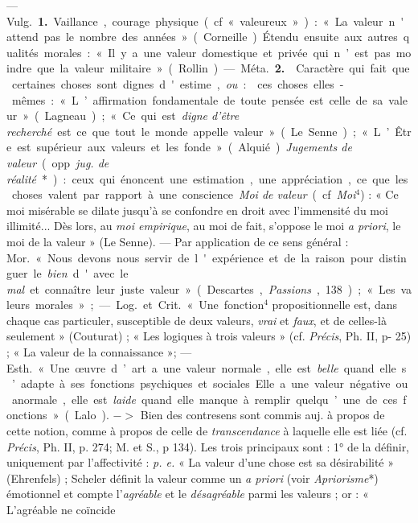 
	\begin{itemize}[leftmargin=1cm, label=, itemsep=1pt]

 — \si{Vulg.} {\bf 1.} Vaillance, courage physique (cf. «
valeureux ») : « La valeur n'attend pas le nombre des années » (Corneille).
Étendu ensuite aux autres qualités morales : « Il y a une valeur domestique et
privée qui n’est pas moindre que la valeur militaire » (Rollin).

— \si{Méta.}  {\bf 2.}  Caractère qui fait que certaines
choses sont dignes d'estime, {\it ou} :  ces choses
elles-mêmes : « L’affirmation fondamentale de toute pensée est celle de sa
valeur » (Lagneau) ; « Ce qui est {\it digne d’être recherché} est ce que
tout le monde appelle valeur » (Le Senne) ; « L’Être est supérieur aux
valeurs et les fonde » (Alquié). {\it Jugements de valeur} (opp. {\it jug. de
réalité}*) : ceux qui énoncent une estimation, une appréciation, ce que les
choses valent par rapport à une conscience. {\it Moi de valeur} (cf.
{\it Moi}$^4$) : « Ce moi misérable se dilate jusqu’à se confondre en droit
avec l’immensité du moi illimité... Dès lors, au {\it moi empirique}, au moi
de fait, s’oppose le moi {\it a priori}, le moi de la valeur » (Le Senne). —
Par application de ce sens général : \si{Mor.} « Nous devons nous servir de
l'expérience et de la raison pour distinguer le {\it bien} d'avec le {\it
mal} et connaître leur juste valeur » (Descartes, {\it Passions}, 138) ; «
Les valeurs morales » ; — \si{Log.} et \si{Crit.} « Une fonction$^4$
propositionnelle est, dans chaque cas particuler, susceptible de deux
valeurs, {\it vrai} et {\it faux}, et de celles-là seulement » (Couturat) ; «
Les logiques à trois valeurs » (cf. {\it Précis}, Ph. II, p- 25) ; « La
valeur de la connaissance »; — \si{Esth.} « Une œuvre d’art a une valeur
normale, elle est {\it belle} quand elle s’adapte à ses fonctions
psychiques et sociales... Elle a une valeur négative ou anormale, elle est
{\it laide} quand elle manque à remplir quelqu’une de ces fonctions » (Lalo).
$->$ Bien des contresens sont commis auj. à propos de cette notion, comme à
propos de celle de {\it transcendance} à laquelle elle est liée (cf.
{\it Précis}, Ph. II, p. 274; M. et S., p 134). Les trois principaux sont : 1°
de la définir, uniquement par l'affectivité : {\it p. e.} « La valeur d’une
chose est sa désirabilité » (Ehrenfels) ; Scheler définit la valeur comme un
{\it a priori} (voir {\it Apriorisme}*) émotionnel et compte l’{\it agréable}
et le {\it désagréable} parmi les valeurs ; or : « L’agréable ne coïncide

\end{itemize}
